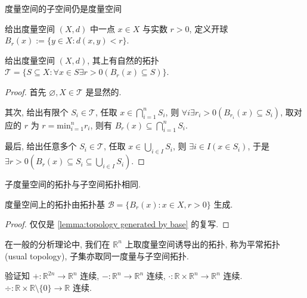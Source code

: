 \begin{example}
    度量空间的子空间仍是度量空间
\end{example}

\begin{definition}[开球]
    给出度量空间 \((X,d)\) 中一点 \(x \in X\) 与实数 \(r > 0\), 定义开球 \(B_r (x) := \{y \in X : d(x,y) < r\}\).
\end{definition}

\begin{definition}
    给出度量空间 \((X,d)\), 其上有自然的拓扑 \(\mathcal{T} = \{S \subseteq X : \forall x \in S \exists r > 0 (B_r(x) \subseteq S)\}\).

    \begin{proof}
        首先 \(\varnothing, X \in \mathcal{T}\) 是显然的.

        其次, 给出有限个 \(S_i \in \mathcal{T}\), 任取 \(x \in \bigcap_{i=1}^n S_i\), 则 \(\forall i \exists r_i > 0 (B_{r_i} (x) \subseteq S_i)\),
        取对应的 \(r\) 为 \(r = \mathrm{min}_{i=1}^n r_i\), 则有 \(B_r (x) \subseteq \bigcap_{i=1}^n S_i\).

        最后, 给出任意多个 \(S_i \in \mathcal{T}\), 任取 \(x \in \bigcup_{i \in I} S_i\), 则 \(\exists i \in I (x \in S_i)\),
        于是 \(\exists r > 0 (B_r (x) \subseteq S_i \subseteq \bigcup_{i \in I} S_i)\).
    \end{proof}
\end{definition}

\begin{corollary}
    子度量空间的拓扑与子空间拓扑相同.
\end{corollary}

\begin{lemma}
    度量空间上的拓扑由拓扑基 \(\mathcal{B} = \{B_r (x) : x \in X, r > 0\}\) 生成.

    \begin{proof}
        仅仅是 \ref{lemma:topology generated by base} 的复写.
    \end{proof}
\end{lemma}

\begin{definition}[平常拓扑]
    在一般的分析理论中, 我们在 \(\mathbb{R}^n\) 上取度量空间诱导出的拓扑, 称为平常拓扑 (usual topology), 子集亦取同一度量与子空间拓扑.
\end{definition}

\begin{corollary}
    验证知 \(+ : \mathbb{R}^{2n} \to \mathbb{R}^n\) 连续, \(- : \mathbb{R}^n \to \mathbb{R}^n\) 连续, \(\cdot : \mathbb{R} \times \mathbb{R}^n \to \mathbb{R}^n\) 连续.
    \(\div : \mathbb{R} \times \mathbb{R} \setminus \{0\} \to \mathbb{R}\) 连续.
\end{corollary}

